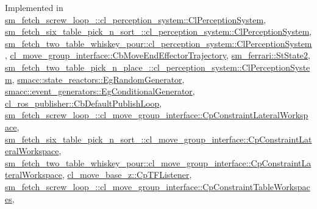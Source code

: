 Implemented in \hyperlink{classsm__fetch__screw__loop__1_1_1cl__perception__system_1_1ClPerceptionSystem_a099122cff1991d93c82cf07af05395f3}{sm\+\_\+fetch\+\_\+screw\+\_\+loop\+\_\+::cl\+\_\+perception\+\_\+system\+::\+Cl\+Perception\+System}, \hyperlink{classsm__fetch__six__table__pick__n__sort__1_1_1cl__perception__system_1_1ClPerceptionSystem_a87292907b7b771d19d91c6de47ea8d1d}{sm\+\_\+fetch\+\_\+six\+\_\+table\+\_\+pick\+\_\+n\+\_\+sort\+\_\+::cl\+\_\+perception\+\_\+system\+::\+Cl\+Perception\+System}, \hyperlink{classsm__fetch__two__table__whiskey__pour_1_1cl__perception__system_1_1ClPerceptionSystem_a66a8dfad8b4403b5a0f50fecead09410}{sm\+\_\+fetch\+\_\+two\+\_\+table\+\_\+whiskey\+\_\+pour\+::cl\+\_\+perception\+\_\+system\+::\+Cl\+Perception\+System}, \hyperlink{classcl__move__group__interface_1_1CbMoveEndEffectorTrajectory_a57fedb6a0603fe569842a13faf19f5cd}{cl\+\_\+move\+\_\+group\+\_\+interface\+::\+Cb\+Move\+End\+Effector\+Trajectory}, \hyperlink{structsm__ferrari_1_1StState2_a194e5d2ceacdd173fd2f65f13fbc665d}{sm\+\_\+ferrari\+::\+St\+State2}, \hyperlink{classsm__fetch__two__table__pick__n__place__1_1_1cl__perception__system_1_1ClPerceptionSystem_ac6e10d6fc38d2b1d561875298307c235}{sm\+\_\+fetch\+\_\+two\+\_\+table\+\_\+pick\+\_\+n\+\_\+place\+\_\+::cl\+\_\+perception\+\_\+system\+::\+Cl\+Perception\+System}, \hyperlink{classsmacc_1_1state__reactors_1_1EgRandomGenerator_a0d442604ba19606ab12a384ee3998b49}{smacc\+::state\+\_\+reactors\+::\+Eg\+Random\+Generator}, \hyperlink{classsmacc_1_1event__generators_1_1EgConditionalGenerator_ab5e500fd01fb21a7e6b836405431c6f2}{smacc\+::event\+\_\+generators\+::\+Eg\+Conditional\+Generator}, \hyperlink{classcl__ros__publisher_1_1CbDefaultPublishLoop_aef241d1976f0105643976545880d5e21}{cl\+\_\+ros\+\_\+publisher\+::\+Cb\+Default\+Publish\+Loop}, \hyperlink{classsm__fetch__screw__loop__1_1_1cl__move__group__interface_1_1CpConstraintLateralWorkspace_a42a932b985fa0e4f9f48e52b363bf6c2}{sm\+\_\+fetch\+\_\+screw\+\_\+loop\+\_\+::cl\+\_\+move\+\_\+group\+\_\+interface\+::\+Cp\+Constraint\+Lateral\+Workspace}, \hyperlink{classsm__fetch__six__table__pick__n__sort__1_1_1cl__move__group__interface_1_1CpConstraintLateralWorkspace_ac2b93d99ca5fb46aabfa98040124b272}{sm\+\_\+fetch\+\_\+six\+\_\+table\+\_\+pick\+\_\+n\+\_\+sort\+\_\+::cl\+\_\+move\+\_\+group\+\_\+interface\+::\+Cp\+Constraint\+Lateral\+Workspace}, \hyperlink{classsm__fetch__two__table__whiskey__pour_1_1cl__move__group__interface_1_1CpConstraintLateralWorkspace_afbbf07ecc60348ce0f40f6aa0c6fd6f3}{sm\+\_\+fetch\+\_\+two\+\_\+table\+\_\+whiskey\+\_\+pour\+::cl\+\_\+move\+\_\+group\+\_\+interface\+::\+Cp\+Constraint\+Lateral\+Workspace}, \hyperlink{classcl__move__base__z_1_1CpTFListener_a0bdf03c329aab2ea038b67e51996a515}{cl\+\_\+move\+\_\+base\+\_\+z\+::\+Cp\+T\+F\+Listener}, \hyperlink{classsm__fetch__screw__loop__1_1_1cl__move__group__interface_1_1CpConstraintTableWorkspaces_a24fc1c2ba2d6f09df2cca9bf0c3d3b20}{sm\+\_\+fetch\+\_\+screw\+\_\+loop\+\_\+::cl\+\_\+move\+\_\+group\+\_\+interface\+::\+Cp\+Constraint\+Table\+Workspaces}, 